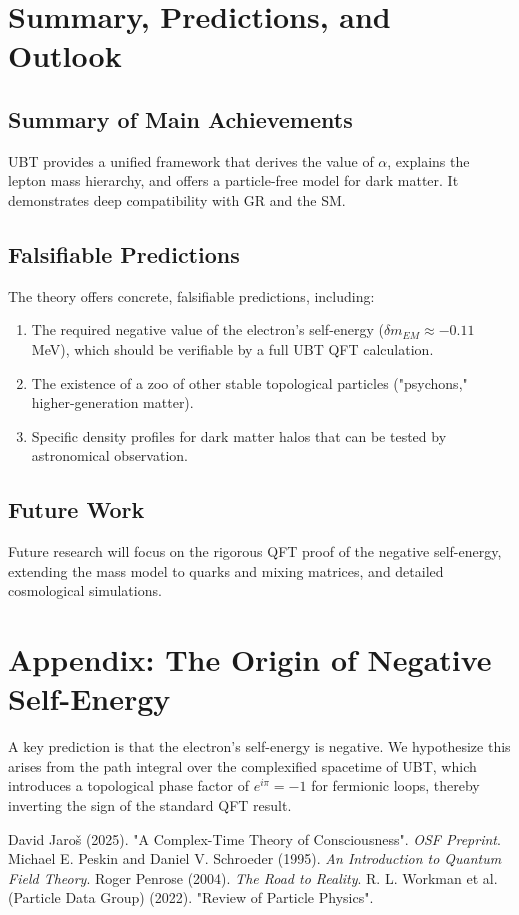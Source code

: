 \documentclass[12pt, a4paper]{article}
\begin{document}
\section{Summary, Predictions, and Outlook}
\subsection{Summary of Main Achievements}
UBT provides a unified framework that derives the value of \( \alpha \), explains the lepton mass hierarchy, and offers a particle-free model for dark matter. It demonstrates deep compatibility with GR and the SM.

\subsection{Falsifiable Predictions}
The theory offers concrete, falsifiable predictions, including:
\begin{enumerate}
    \item The required negative value of the electron's self-energy (\( \delta m_{EM} \approx -0.11 \) MeV), which should be verifiable by a full UBT QFT calculation.
    \item The existence of a zoo of other stable topological particles ("psychons," higher-generation matter).
    \item Specific density profiles for dark matter halos that can be tested by astronomical observation.
\end{enumerate}

\subsection{Future Work}
Future research will focus on the rigorous QFT proof of the negative self-energy, extending the mass model to quarks and mixing matrices, and detailed cosmological simulations.

\appendix
\section{Appendix: The Origin of Negative Self-Energy}
A key prediction is that the electron's self-energy is negative. We hypothesize this arises from the path integral over the complexified spacetime of UBT, which introduces a topological phase factor of \( e^{i\pi} = -1 \) for fermionic loops, thereby inverting the sign of the standard QFT result.

\begin{thebibliography}{9}
     David Jaroš (2025). "A Complex-Time Theory of Consciousness". \textit{OSF Preprint}.
     Michael E. Peskin and Daniel V. Schroeder (1995). \textit{An Introduction to Quantum Field Theory}.
     Roger Penrose (2004). \textit{The Road to Reality}.
     R. L. Workman et al. (Particle Data Group) (2022). "Review of Particle Physics".
\end{thebibliography}
\end{document}
